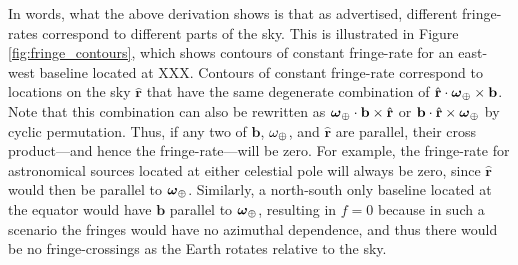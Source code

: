 \documentclass[twocolumn,apj,numberedappendix]{emulateapj}
\newcommand{\rhat}{\hat{\mathbf{r}}}
\begin{document}
In words, what the above derivation shows is that as advertised, different fringe-rates correspond to different parts of the sky. This is illustrated in Figure \ref{fig:fringe_contours}, which shows contours of constant fringe-rate for an east-west baseline located at XXX. Contours of constant fringe-rate correspond to locations on the sky $\rhat$ that have the same degenerate combination of $\rhat \cdot \boldsymbol \omega_\Earth \times \mathbf{b} $. Note that this combination can also be rewritten as $\boldsymbol \omega_\Earth \cdot \mathbf{b} \times \rhat $ or $\mathbf{b} \cdot \rhat \times  \boldsymbol \omega_\Earth $ by cyclic permutation. Thus, if any two of $\mathbf{b}$, $\omega_\oplus$, and $\rhat$ are parallel, their cross product---and hence the fringe-rate---will be zero. For example, the fringe-rate for astronomical sources located at either celestial pole will always be zero, since $\rhat$ would then be parallel to $\boldsymbol \omega_\oplus$. Similarly, a north-south only baseline located at the equator would have $\mathbf{b}$ parallel to $\boldsymbol \omega_\oplus$, resulting in $f=0$ because in such a scenario the fringes would have no azimuthal dependence, and thus there would be no fringe-crossings as the Earth rotates relative to the sky.
\end{document}
